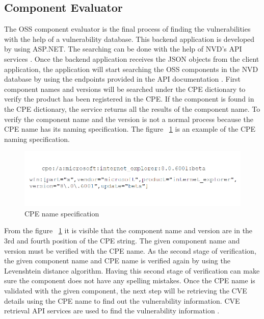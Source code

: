\subsection{Component Evaluator}
The \acs{OSS} component evaluator is the final process of finding the vulnerabilities with the help of a vulnerability database. This backend application is developed by using ASP.NET. The searching can be done with the help of \acs{NVD}'s API services \cite{NVDApi}. Once the backend application receives the JSON objects from the client application, the application will start searching the OSS components in the \acs{NVD} database by using the endpoints provided in the API documentation \cite{NVDApi}. First component names and versions will be searched under the \acs{CPE} dictionary to verify the product has been registered in the \acs{CPE}. If the component is found in the \acs{CPE} dictionary, the service returns all the results of the component name. To verify the component name and the version is not a normal process because the \acs{CPE} name has its naming specification. The figure ~\ref{fig:cpe_name} is an example of the \acs{CPE} naming specification.
 \begin{figure}[h!]
	\includegraphics[width=15cm]{includes/cpe_name.png}
	\centering
	\caption{CPE name specification}
	\label{fig:cpe_name}
\end{figure}
From the figure ~\ref{fig:cpe_name} it is visible that the component name and version are in the 3rd and fourth position of the \acs{CPE} string. The given component name and version must be verified with the \acs{CPE} name. As the second stage of verification, the given component name and \acs{CPE} name is verified again by using the Levenshtein distance algorithm. Having this second stage of verification can make sure the component does not have any spelling mistakes. Once the \acs{CPE} name is validated with the given component, the next step will be retrieving the \acs{CVE} details using the \acs{CPE} name to find out the vulnerability information. \acs{CVE} retrieval API services are used to find the vulnerability information \cite{NVDApi}. 

